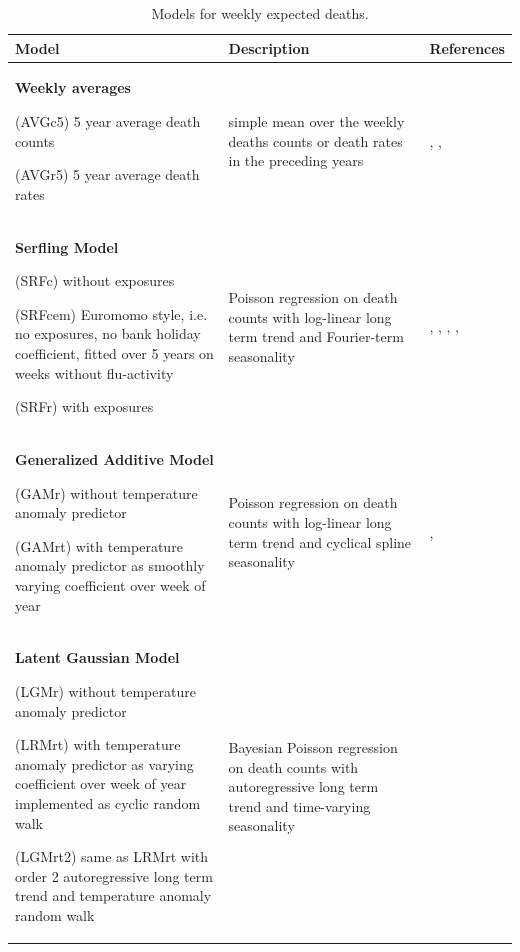 \documentclass[12pt]{article}
\begin{document}
\begin{table}[H]
\small
\caption{Models for weekly expected deaths.}
\label{tab:models}
\begin{tabularx}{\textwidth} {
  >{\raggedright\arraybackslash}X
  >{\raggedright\arraybackslash}X
  >{\raggedright\arraybackslash}X }
\toprule
\textbf{Model} & \textbf{Description} & \textbf{References} \\ \midrule
\textbf{Weekly averages}\par
(AVGc5) 5 year average death counts\par
(AVGr5) 5 year average death rates
 &
 simple mean over the weekly deaths counts or death rates in the preceding years
 &
\cite{Modig2020}, \cite{Stang2020}, \cite{Campbell2021}\\ \midrule
\textbf{Serfling Model}\par
(SRFc) without exposures\par
(SRFcem) Euromomo style, i.e. no exposures, no bank holiday coefficient, fitted over 5 years on weeks without flu-activity\par
(SRFr) with exposures
&
Poisson regression on death counts with log-linear long term trend and Fourier-term seasonality
&
\cite{Barnard2020}, \cite{Weinberger2020}, \cite{Woolf2020}, \cite{EuroMoMo2020}, \cite{Arolas2021}
\\ \midrule
\textbf{Generalized Additive Model}\par
(GAMr) without temperature anomaly predictor\par
(GAMrt) with temperature anomaly predictor as smoothly varying coefficient over week of year
&
Poisson regression on death counts with log-linear long term trend and cyclical spline seasonality
&
\cite{Aburto2021}, \cite{Scortichini2020}
\\ \midrule
\textbf{Latent Gaussian Model}\par
(LGMr) without temperature anomaly predictor\par
(LRMrt) with temperature anomaly predictor as varying coefficient over week of year implemented as cyclic random walk\par
(LGMrt2) same as LRMrt with order 2 autoregressive long term trend and temperature anomaly random walk
&
Bayesian Poisson regression on death counts with autoregressive long term trend and time-varying seasonality
&
\cite{Kontis2020}
\\ \bottomrule
\end{tabularx}
\end{table}
\end{document}
